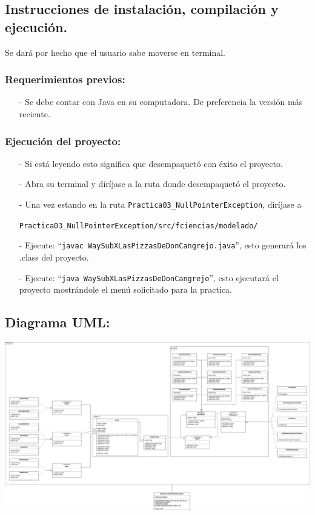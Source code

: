 \documentclass{article}
\newcommand{\code}[1]{\textcolor{white!25!black}{\texttt{#1}}}
\begin{document}
\subsection*{Instrucciones de instalación, compilación y ejecución.}
Se dará por hecho que el usuario sabe moverse en terminal.\\

\subsubsection*{Requerimientos previos:}
\begin{itemize}
\item[-] Se debe contar con Java en su computadora. De preferencia la versión más reciente.
\end{itemize}

\subsubsection*{Ejecución del proyecto:}
\begin{itemize}
\item[-] Si está leyendo esto significa que desempaquetó con éxito el proyecto.
\item[-] Abra su terminal y diríjase a la ruta donde desempaquetó el proyecto.
\item[-] Una vez estando en la ruta \code{Practica03\_NullPointerException}, diríjase a

  \code{Practica03\_NullPointerException/src/fciencias/modelado/}
\item[-] Ejecute: “\code{javac WaySubXLasPizzasDeDonCangrejo.java}”, esto generará los .class del proyecto.
\item[-] Ejecute: “\code{java WaySubXLasPizzasDeDonCangrejo}”, esto ejecutará el proyecto mostrándole el menú solicitado para la practica.
\end{itemize}

\newpage
\subsection*{Diagrama UML:}
\begin{center}
  \includegraphics[scale=0.16]{./Practica03UML.png}
\end{center}
\end{document}
